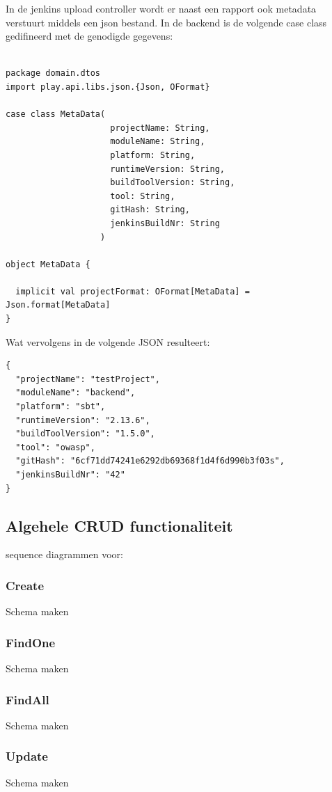 In de jenkins upload controller wordt er naast een rapport ook metadata verstuurt middels een json bestand. In de backend is de volgende case class gedifineerd met de genodigde gegevens:
\begin{lstlisting}[caption={case class MetaData in MetaData.scala},label=lst:metdataScala]

package domain.dtos
import play.api.libs.json.{Json, OFormat}

case class MetaData(
                     projectName: String,
                     moduleName: String,
                     platform: String,
                     runtimeVersion: String,
                     buildToolVersion: String,
                     tool: String,
                     gitHash: String,
                     jenkinsBuildNr: String
                   )

object MetaData {

  implicit val projectFormat: OFormat[MetaData] = Json.format[MetaData]
}

\end{lstlisting}
Wat vervolgens in de volgende JSON resulteert:
\begin{lstlisting}[caption={metadata JSon object behorende bij de case class}, label={lst:metadatajson}]
{
  "projectName": "testProject",
  "moduleName": "backend",
  "platform": "sbt",
  "runtimeVersion": "2.13.6",
  "buildToolVersion": "1.5.0",
  "tool": "owasp",
  "gitHash": "6cf71dd74241e6292db69368f1d4f6d990b3f03s",
  "jenkinsBuildNr": "42"
}
\end{lstlisting}

\subsection{Algehele CRUD functionaliteit}\label{subsec:algehele-crud-functionaliteit}
sequence diagrammen voor:
\subsubsection*{Create}Schema maken
\subsubsection*{FindOne}Schema maken
\subsubsection*{FindAll}Schema maken
\subsubsection*{Update}Schema maken
